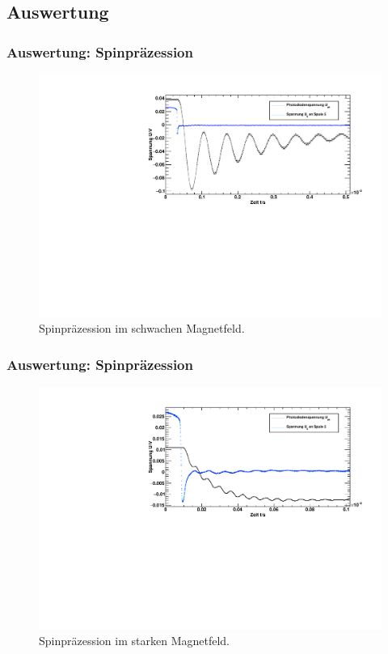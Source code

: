 \subsection{Auswertung}

\begin{frame}
\frametitle{Auswertung: Spinpräzession}

\begin{figure}
    \centering
    \includegraphics[width=\textwidth]{../img/02-63-7mA-087mA.pdf}
    \caption{Spinpräzession im schwachen Magnetfeld.}  
\end{figure} 
  
\end{frame}


\begin{frame}
\frametitle{Auswertung: Spinpräzession}

\begin{figure}
    \centering
    \includegraphics[width=\textwidth]{../img/02-63-7mA-020mA.pdf}
    \caption{Spinpräzession im starken Magnetfeld.}  
\end{figure} 
  
\end{frame}



